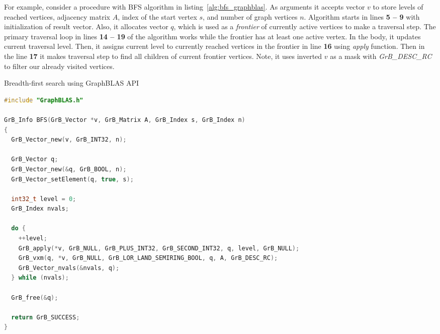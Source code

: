 For example, consider a procedure with BFS algorithm in listing~\ref{alg:bfs_graphblas}. As arguments it accepts vector $v$ to store levels of reached vertices, adjacency matrix $A$, index of the start vertex $s$, and number of graph vertices $n$. Algorithm starts in lines \textbf{5 -- 9} with initialization of result vector. Also, it allocates vector $q$, which is used as a \textit{frontier} of currently active vertices to make a traversal step. The primary traversal loop in lines \textbf{14 -- 19} of the algorithm works while the frontier has at least one active vertex. In the body, it updates current traversal level. Then, it assigns current level to currently reached vertices in the frontier in line \textbf{16} using \textit{apply} function. Then in the line \textbf{17} it makes traversal step to find all children of current frontier vertices. Note, it uses inverted $v$ as a mask with \textit{GrB\_DESC\_RC} to filter our already visited vertices.



\lstset{style=codelistingstyle}

\begin{algorithm}[]
\caption{Breadth-first search using GraphBLAS API}
\label{alg:bfs_graphblas}
\begin{lstlisting}[language=C++]
#include "GraphBLAS.h"

GrB_Info BFS(GrB_Vector *v, GrB_Matrix A, GrB_Index s, GrB_Index n)
{
  GrB_Vector_new(v, GrB_INT32, n);

  GrB_Vector q;
  GrB_Vector_new(&q, GrB_BOOL, n);
  GrB_Vector_setElement(q, true, s); 

  int32_t level = 0;
  GrB_Index nvals;
  
  do {
    ++level;                                               
    GrB_apply(*v, GrB_NULL, GrB_PLUS_INT32, GrB_SECOND_INT32, q, level, GrB_NULL);       
    GrB_vxm(q, *v, GrB_NULL, GrB_LOR_LAND_SEMIRING_BOOL, q, A, GrB_DESC_RC);                           
    GrB_Vector_nvals(&nvals, q);
  } while (nvals);
  
  GrB_free(&q);

  return GrB_SUCCESS;
}
\end{lstlisting}
\end{algorithm}

